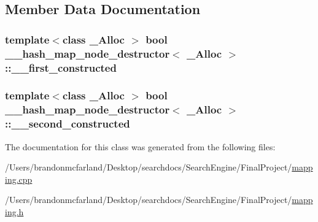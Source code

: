 \subsection{Member Data Documentation}
\hypertarget{class____hash__map__node__destructor_aca6510f2ab38d2127b39e734f98114bd}{}
\subsubsection[{\+\_\+\+\_\+first\+\_\+constructed}]{\setlength{\rightskip}{0pt plus 5cm}template$<$class \+\_\+\+Alloc $>$ bool {\bf \+\_\+\+\_\+hash\+\_\+map\+\_\+node\+\_\+destructor}$<$ \+\_\+\+Alloc $>$\+::\+\_\+\+\_\+first\+\_\+constructed}\label{class____hash__map__node__destructor_aca6510f2ab38d2127b39e734f98114bd}
\hypertarget{class____hash__map__node__destructor_adf3d560f8a42d9f2afa1d8805152adcf}{}
\subsubsection[{\+\_\+\+\_\+second\+\_\+constructed}]{\setlength{\rightskip}{0pt plus 5cm}template$<$class \+\_\+\+Alloc $>$ bool {\bf \+\_\+\+\_\+hash\+\_\+map\+\_\+node\+\_\+destructor}$<$ \+\_\+\+Alloc $>$\+::\+\_\+\+\_\+second\+\_\+constructed}\label{class____hash__map__node__destructor_adf3d560f8a42d9f2afa1d8805152adcf}


The documentation for this class was generated from the following files\+:\begin{DoxyCompactItemize}
\item 
/\+Users/brandonmcfarland/\+Desktop/searchdocs/\+Search\+Engine/\+Final\+Project/\hyperlink{mapping_8cpp}{mapping.\+cpp}\item 
/\+Users/brandonmcfarland/\+Desktop/searchdocs/\+Search\+Engine/\+Final\+Project/\hyperlink{mapping_8h}{mapping.\+h}\end{DoxyCompactItemize}
